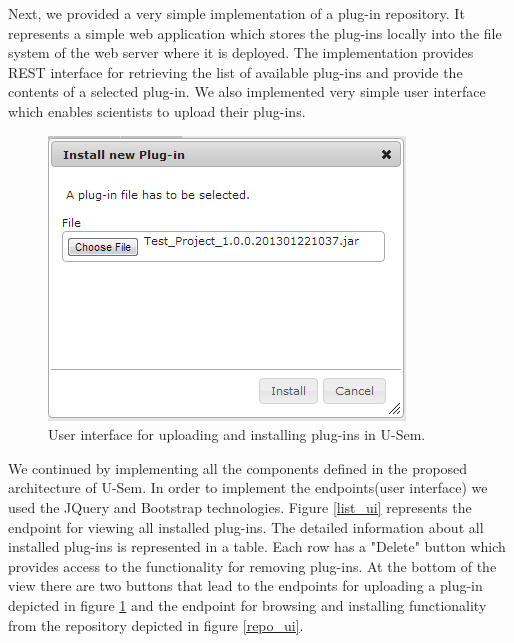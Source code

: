 Next, we provided a very simple implementation of a plug-in repository. It represents a simple web application which stores the plug-ins locally into the file system of the web server where it is deployed. The implementation provides REST interface for retrieving the list of available plug-ins and provide the contents of a selected plug-in. We also implemented very simple user interface which enables scientists to upload their plug-ins. 


\begin{figure}[h!]
  \centering
  	\includegraphics[scale=0.6]{plug-in/ui/upload.png}
  \caption{User interface for uploading and installing plug-ins in U-Sem.}
  \label{upload_ui}
\end{figure}

We continued by implementing all the components defined in the proposed architecture of U-Sem. In order to implement the endpoints(user interface) we used the JQuery and Bootstrap technologies. Figure \ref{list_ui} represents the endpoint for viewing all installed plug-ins. The detailed information about all installed plug-ins is represented in a table. Each row has a "Delete" button which provides access to the functionality for removing plug-ins. At the bottom of the view there are two buttons that lead to the endpoints for uploading a plug-in depicted in figure \ref{upload_ui} and the endpoint for browsing and installing functionality from the repository depicted in figure \ref{repo_ui}.

